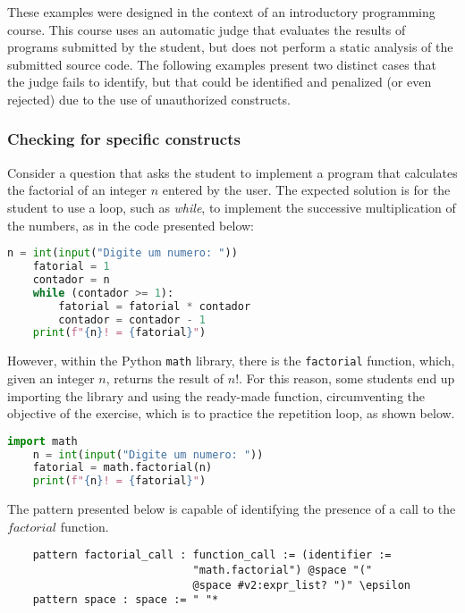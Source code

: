 These examples were designed in the context of an introductory programming course.
This course uses an automatic judge that evaluates the results of programs
submitted by the student, but does not perform a static analysis of the submitted
source code. The following examples present two distinct cases that the judge
fails to identify, but that could be identified and penalized (or even rejected) due
to the use of unauthorized constructs.

\subsubsection{Checking for specific constructs}

Consider a question that asks the student to implement a program that
calculates the factorial of an integer \(n\) entered by the user.
The expected solution is for the student to use a loop, such as \textit{while},
to implement the successive multiplication of the numbers, as in the code
presented below:

\begin{lstlisting}[language=Python]
    n = int(input("Digite um numero: "))
    fatorial = 1
    contador = n
    while (contador >= 1):
        fatorial = fatorial * contador
        contador = contador - 1
    print(f"{n}! = {fatorial}")
\end{lstlisting}

However, within the Python \texttt{math} library, there is the \texttt{factorial}
function, which, given an integer \(n\), returns the result of \(n!\).
For this reason, some students end up importing the library and using the
ready-made function, circumventing the objective of the exercise, which is
to practice the repetition loop, as shown below.

\begin{lstlisting}[language=Python]
    import math
    n = int(input("Digite um numero: "))
    fatorial = math.factorial(n)
    print(f"{n}! = {fatorial}")
\end{lstlisting}


The pattern presented below is capable of identifying the presence of a call
to the \(factorial\) function.

\begin{verbatim}
    pattern factorial_call : function_call := (identifier :=
                             "math.factorial") @space "("
                             @space #v2:expr_list? ")" \epsilon
    pattern space : space := " "*
\end{verbatim}

